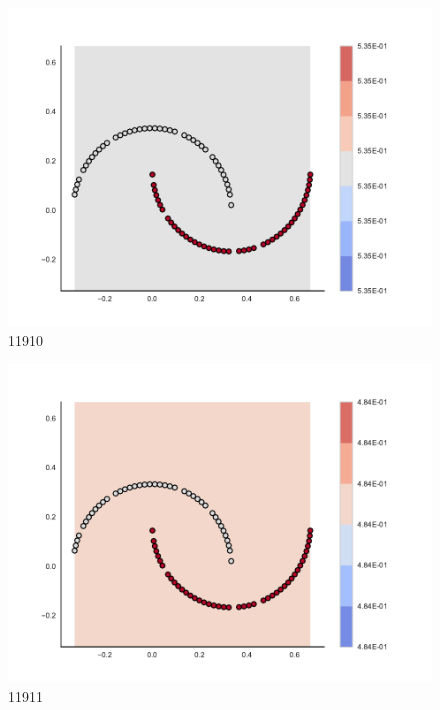 \begin{subfigure}[b]{0.09\textwidth}
    \includegraphics[clip, trim=2.35cm 1.75cm 4.5cm 0cm,width=\textwidth]{img/convergence/11910.pdf}
    \caption{11910}
    \label{fig:convergence_11910}
\end{subfigure}
%
\begin{subfigure}[b]{0.09\textwidth}
    \includegraphics[clip, trim=2.35cm 1.75cm 4.5cm 0cm,width=\textwidth]{img/convergence/11911.pdf}
    \caption{11911}
    \label{fig:convergence_11911}
\end{subfigure}
%
